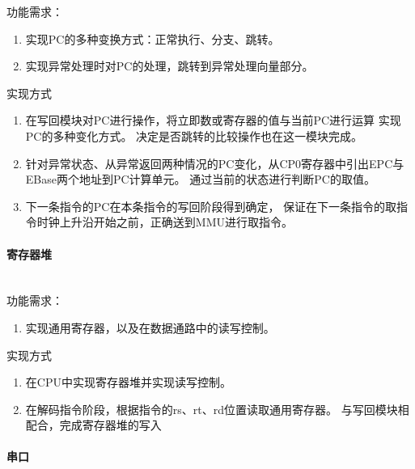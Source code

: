                 功能需求：
                \begin{enumerate}
                \item
                实现PC的多种变换方式：正常执行、分支、跳转。
                \item
                实现异常处理时对PC的处理，跳转到异常处理向量部分。
                \end{enumerate}

                实现方式
                \begin{enumerate}
                \item
                在写回模块对PC进行操作，将立即数或寄存器的值与当前PC进行运算%
                实现PC的多种变化方式。%
                决定是否跳转的比较操作也在这一模块完成。
                \item
                针对异常状态、从异常返回两种情况的PC变化，从CP0寄存器中引出EPC与EBase两个地址到PC计算单元。
                通过当前的状态进行判断PC的取值。
                \item
                下一条指令的PC在本条指令的写回阶段得到确定，
                保证在下一条指令的取指令时钟上升沿开始之前，正确送到MMU进行取指令。
                \end{enumerate}

            \paragraph{寄存器堆}
                \mbox{} \\ 

                功能需求：
                \begin{enumerate}
                \item
                实现通用寄存器，以及在数据通路中的读写控制。
                \end{enumerate}

                实现方式
                \begin{enumerate}
                \item
                在CPU中实现寄存器堆并实现读写控制。
                \item
                在解码指令阶段，根据指令的rs、rt、rd位置读取通用寄存器。
                与写回模块相配合，完成寄存器堆的写入
                \end{enumerate}

            \paragraph{串口}
                \mbox{} \\

